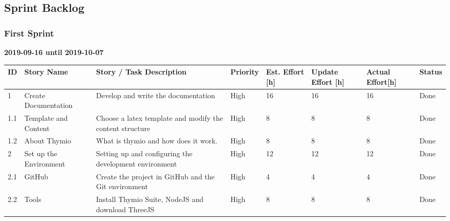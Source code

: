 \documentclass{scrartcl}
\begin{document}
\subsection{Sprint Backlog}
\subsubsection{First Sprint}
\textbf{2019-09-16 until 2019-10-07}
\begin{longtable}{p{5mm}|p{2cm}|p{4cm}|p{1cm}|p{1cm}|p{1cm}|p{1cm}|p{15mm}}
  ID                     & Story Name & Story / Task Description & Priority & Est. Effort {[}h{]} & Update Effort {[}h{]} & Actual Effort{[}h{]} & Status                \\ \hline
  1 & Create Documentation & Develop and write the documentation & High & 16 & 16 & 16 & Done \\ 
  1.1 & Template and Content & Choose a latex template and modify the content structure & High & 8 & 8 & 8 & Done \\ 
  1.2 & About Thymio & What is thymio and how does it work. & High & 8 & 8 & 8 & Done \\ 
  2 & Set up the Environment & Setting up and configuring the development environment & High & 12 & 12 & 12 & Done \\ 
  2.1 & GitHub & Create the project in GitHub and the Git environment & High & 4 & 4 & 4 & Done \\ 
  2.2 & Tools & Install Thymio Suite, NodeJS and download ThreeJS & High & 8 & 8 & 8 & Done \\ 
\end{longtable}
\end{document}
